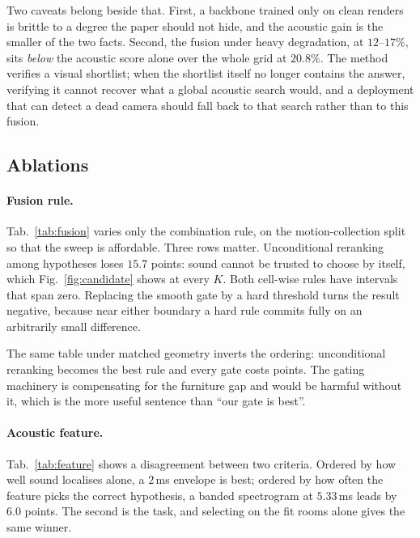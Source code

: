 Two caveats belong beside that. First, a backbone trained only on clean renders
is brittle to a degree the paper should not hide, and the acoustic gain is the
smaller of the two facts. Second, the fusion under heavy degradation, at
$12$--$17\%$, sits \emph{below} the acoustic score alone over the whole grid at
$20.8\%$. The method verifies a visual shortlist; when the shortlist itself no
longer contains the answer, verifying it cannot recover what a global acoustic
search would, and a deployment that can detect a dead camera should fall back
to that search rather than to this fusion.

\subsection{Ablations}
\label{sec:ablation}




\paragraph{Fusion rule.} Tab.~\ref{tab:fusion} varies only the combination
rule, on the motion-collection split so that the sweep is affordable. Three
rows matter. Unconditional reranking among hypotheses loses $15.7$ points: sound
cannot be trusted to choose by itself, which Fig.~\ref{fig:candidate} shows at
every $K$. Both cell-wise rules have intervals that span zero. Replacing the
smooth gate by a hard threshold turns the result negative, because near either
boundary a hard rule commits fully on an arbitrarily small difference.

The same table under matched geometry inverts the ordering: unconditional
reranking becomes the best rule and every gate costs points. The gating
machinery is compensating for the furniture gap and would be harmful without
it, which is the more useful sentence than ``our gate is best''.

\paragraph{Acoustic feature.} Tab.~\ref{tab:feature} shows a disagreement
between two criteria. Ordered by how well sound localises alone, a $2$\,ms
envelope is best; ordered by how often the feature picks the correct
hypothesis, a banded spectrogram at $5.33$\,ms leads by $6.0$ points. The
second is the task, and selecting on the fit rooms alone gives the same winner.

